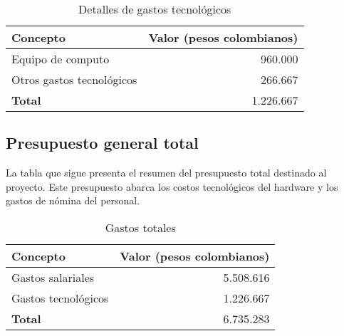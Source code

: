 \begin{table}[h]
    \centering
    
    \label{tab:gastos-tecnologicos}
    \begin{tabular}{|l|r|}
        \hline
        \textbf{Concepto} & \textbf{Valor (pesos colombianos)} \\
        \hline
        Equipo de computo & 960.000 \\
        Otros gastos tecnológicos & 266.667 \\
        \hline
        \textbf{Total} & 1.226.667 \\
        \hline
    \end{tabular}
    \caption{Detalles de gastos tecnológicos}
\end{table}
\newpage
\subsection{Presupuesto general total}
La tabla que sigue presenta el resumen del presupuesto total destinado al proyecto. Este presupuesto abarca los costos tecnológicos del hardware y los gastos de nómina del personal.


\begin{table}[h]
    \centering

    \label{tab:gastos}
    \begin{tabular}{|l|r|}
        \hline
        \textbf{Concepto} & \textbf{Valor (pesos colombianos)} \\
        \hline
        Gastos salariales & 5.508.616 \\
        Gastos tecnológicos & 1.226.667 \\
        \hline
        \textbf{Total} & 6.735.283 \\
        \hline
    \end{tabular}
    \caption{Gastos totales}
\end{table}

